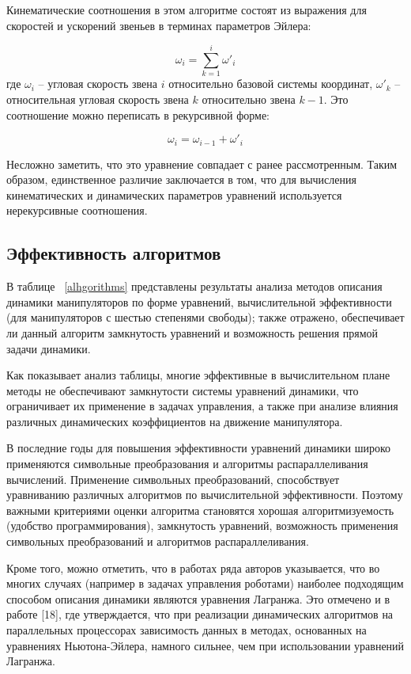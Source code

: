 Кинематические соотношения в этом алгоритме состоят из  выражения для скоростей и ускорений звеньев в терминах параметров Эйлера:

\begin{equation}
\omega_i = \sum_{k=1}^{i} \omega'_i
\end{equation}
где $\omega_i$ -- угловая скорость звена $i$ относительно базовой системы координат, $\omega'_k$ -- относительная угловая скорость звена $k$ относительно звена $k-1$. Это соотношение можно переписать в рекурсивной форме:

\begin{equation}
\omega_i = \omega_{i-1} + \omega'_i
\end{equation}

Несложно заметить, что это уравнение совпадает с ранее рассмотренным. Таким образом, единственное различие заключается в том, что для вычисления кинематических и динамических параметров уравнений используется нерекурсивные соотношения.

\subsection{Эффективность алгоритмов}

В таблице ~\ref{alhgorithms} представлены результаты анализа методов описания динамики манипуляторов по форме уравнений, вычислительной эффективности (для манипуляторов с шестью степенями свободы); также отражено, обеспечивает ли данный алгоритм замкнутость уравнений и возможность решения прямой задачи динамики.

Как показывает анализ таблицы, многие эффективные в вычислительном плане методы не обеспечивают замкнутости системы уравнений динамики, что ограничивает их применение в задачах управления, а также при анализе влияния различных динамических коэффициентов на движение манипулятора.

В последние годы для повышения эффективности уравнений динамики широко применяются символьные преобразования и алгоритмы распараллеливания вычислений. Применение символьных преобразований, способствует уравниванию различных алгоритмов по вычислительной эффективности. Поэтому важными критериями оценки алгоритма становятся  хорошая  алгоритмизуемость (удобство программирования), замкнутость уравнений, возможность применения символьных преобразований и алгоритмов распараллеливания.

Кроме того, можно отметить, что в работах ряда авторов указывается, что во многих случаях (например в задачах управления роботами) наиболее подходящим способом описания динамики являются уравнения Лагранжа. Это отмечено и в работе [18], где утверждается, что при реализации динамических алгоритмов на параллельных процессорах зависимость данных в методах, основанных на уравнениях Ньютона-Эйлера, намного сильнее, чем при использовании уравнений Лагранжа.

